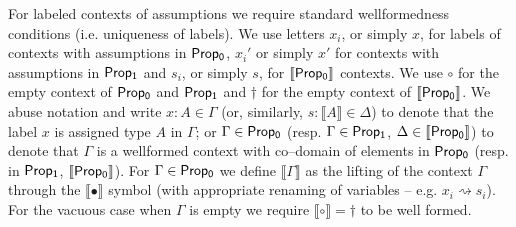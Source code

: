 	
	For labeled contexts of assumptions we require standard wellformedness conditions (i.e. uniqueness of labels).
	We use letters $x_i$, or simply $x$, for labels of  contexts with assumptions in $\sf Prop_0$, $x_i'$ or simply $x'$ for contexts with assumptions in   $\sf Prop_1$ and $s_i$, or simply $s$,  
	for $\sf \llbracket Prop_0 \rrbracket$ contexts. 
	We use $\circ$ for the empty context of ${\sf Prop_0}$ and ${\sf Prop_1}$ and  $\dagger$ for the empty context of ${ \llbracket {\sf Prop_0}\rrbracket}$.
	We abuse notation and write $x:A\in\Gamma$ (or, similarly, $s:\llbracket A\rrbracket\in\Delta$) to denote that the label $x$ is assigned type $A$ in $\Gamma$; or $\Gamma\in {\sf Prop_0}$ 
	(resp. $\Gamma \in {\sf Prop_1}$, $\Delta\in {\sf \llbracket Prop_0\rrbracket}$)  
	to denote that  $\Gamma$ is a wellformed context  with  co--domain of elements in ${\sf Prop_0}$ (resp. in ${\sf Prop_1}$, $\llbracket {\sf Prop_0}\rrbracket$).
	For $\Gamma \in {\sf Prop_0}$ we define  $\llbracket \Gamma\rrbracket$ as  the lifting of the context $\Gamma$ through the $\llbracket \bullet \rrbracket$  symbol 
	(with appropriate renaming of variables -- e.g. $x_i\rightsquigarrow s_i$). For the vacuous case  when $\Gamma$  is  empty 
	we require $\llbracket\circ \rrbracket = \dagger$ to be well formed.
	
